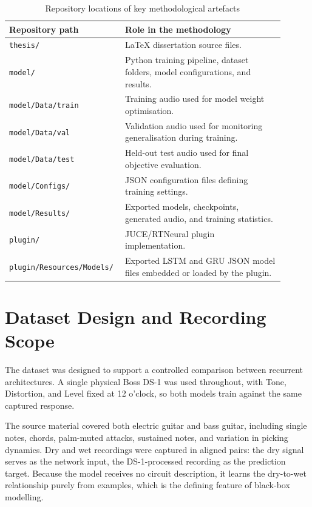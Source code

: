 \begin{table}[h]
  \centering
  \caption{Repository locations of key methodological artefacts}
  \label{tab:repository-artefacts}
  \begin{tabular}{p{0.34\linewidth} p{0.56\linewidth}}
    \hline
    \textbf{Repository path} & \textbf{Role in the methodology} \\
    \hline
    \texttt{thesis/} & LaTeX dissertation source files. \\
    \texttt{model/} & Python training pipeline, dataset folders, model configurations, and results. \\
    \texttt{model/Data/train} & Training audio used for model weight optimisation. \\
    \texttt{model/Data/val} & Validation audio used for monitoring generalisation during training. \\
    \texttt{model/Data/test} & Held-out test audio used for final objective evaluation. \\
    \texttt{model/Configs/} & JSON configuration files defining training settings. \\
    \texttt{model/Results/} & Exported models, checkpoints, generated audio, and training statistics. \\
    \texttt{plugin/} & JUCE/RTNeural plugin implementation. \\
    \texttt{plugin/Resources/Models/} & Exported LSTM and GRU JSON model files embedded or loaded by the plugin. \\
    \hline
  \end{tabular}
\end{table}

\section{Dataset Design and Recording Scope}
\label{sec:dataset-design-recording-scope}

The dataset was designed to support a controlled comparison between recurrent architectures. A single physical Boss DS-1 was used throughout, with Tone, Distortion, and Level fixed at 12 o'clock, so both models train against the same captured response.

The source material covered both electric guitar and bass guitar, including single notes, chords, palm-muted attacks, sustained notes, and variation in picking dynamics. Dry and wet recordings were captured in aligned pairs: the dry signal serves as the network input, the DS-1-processed recording as the prediction target. Because the model receives no circuit description, it learns the dry-to-wet relationship purely from examples, which is the defining feature of black-box modelling.

